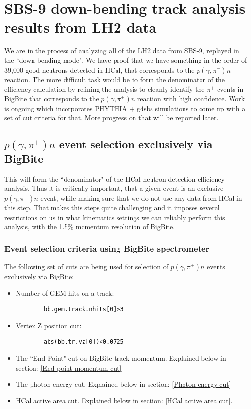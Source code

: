 \section{SBS-9 down-bending track analysis results from LH2 data}
We are in the process of analyzing all of the LH2 data from SBS-9, replayed in the ``down-bending mode". We have proof that we have something in the order of 39,000 good neutrons detected in HCal, that corresponds to the $p(\gamma,\pi^+)n$ reaction. The more difficult task would be to form the denominator of the efficiency calculation by refining the analysis to cleanly identify the $\pi^+$ events in BigBite that corresponds to the $p(\gamma,\pi^+)n$ reaction with high confidence. Work is ongoing which incorporates PHYTHIA + g4sbs simulations to come up with a set of cut criteria for that. More progress on that will be reported later.

\subsection{$p(\gamma,\pi^+)n$ event selection exclusively via BigBite}
This will form the ``denominator" of the HCal neutron detection efficiency analysis. Thus it is critically important, that a given event is an exclusive $p(\gamma,\pi^+)n$ event, while making sure that we do not use any data from HCal in this step. That makes this steps quite challenging and it imposes several restrictions on us in what kinematics settings we can reliably perform this analysis, with the 1.5\% momentum resolution of BigBite.

\subsubsection{Event selection criteria using BigBite spectrometer}\label{Denominator cuts}
The following set of cuts are being used for selection of $p(\gamma,\pi^+)n$ events exclusively via BigBite:
\begin{itemize}

    \item Number of GEM hits on a track:
    \begin{verbatim}
        bb.gem.track.nhits[0]>3
    \end{verbatim}

    \item Vertex Z position cut:
    \begin{verbatim}
        abs(bb.tr.vz[0])<0.0725
    \end{verbatim}

    \item The ``End-Point" cut on BigBite track momentum. Explained below in section: \ref{End-point momentum cut}

    \item The photon energy cut. Explained below in section: \ref{Photon energy cut}

    \item HCal active area cut. Explained below in section: \ref{HCal active area cut}.  
    
\end{itemize}

